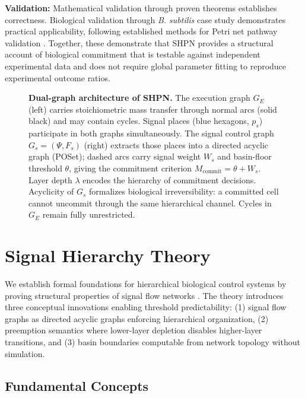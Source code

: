 \documentclass[10pt,letterpaper]{article}
\begin{document}
\textbf{Validation:} Mathematical validation through proven theorems establishes correctness. Biological validation through \textit{B. subtilis} case study demonstrates practical applicability, following established methods for Petri net pathway validation \cite{heiner2004,koch2005,gilbert2006}. Together, these demonstrate that SHPN provides a structural account of biological commitment that is testable against independent experimental data and does not require global parameter fitting to reproduce experimental outcome ratios.

\begin{figure}[!h]
\caption{\textbf{Dual-graph architecture of SHPN.} The execution graph $G_E$
(left) carries stoichiometric mass transfer through normal arcs (solid black)
and may contain cycles. Signal places (blue hexagons, $p_s$) participate in
both graphs simultaneously. The signal control graph $G_s = (\Psi, F_s)$
(right) extracts those places into a directed acyclic graph (POSet); dashed
arcs carry signal weight $W_s$ and basin-floor threshold $\theta$, giving the
commitment criterion $M_{\mathrm{commit}} = \theta + W_s$. Layer depth
$\lambda$ encodes the hierarchy of commitment decisions. Acyclicity of $G_s$
formalizes biological irreversibility: a committed cell cannot uncommit through
the same hierarchical channel. Cycles in $G_E$ remain fully unrestricted.}
\label{fig:dual_graph}
\end{figure}

\section{Signal Hierarchy Theory}

We establish formal foundations for hierarchical biological control systems by proving structural properties of signal flow networks \cite{petri1962,murata1989}. The theory introduces three conceptual innovations enabling threshold predictability: (1) signal flow graphs as directed acyclic graphs enforcing hierarchical organization, (2) preemption semantics where lower-layer depletion disables higher-layer transitions, and (3) basin boundaries computable from network topology without simulation.

\subsection{Fundamental Concepts}
\end{document}
